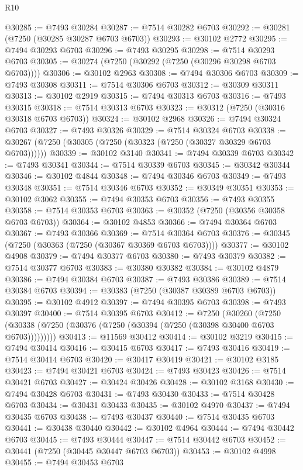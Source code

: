 \begin{lexlean}{R10}
\begin{coremodule}
@30285 := @7493 @30284
@30287 := @7514 @30282 @6703
@30292 := @30281 (@7250 (@30285 @30287 @6703 @6703))
@30293 := @30102 @2772
@30295 := @7494 @30293 @6703
@30296 := @7493 @30295
@30298 := @7514 @30293 @6703
@30305 := @30274 (@7250 (@30292 (@7250 (@30296 @30298 @6703 @6703))))
@30306 := @30102 @2963
@30308 := @7494 @30306 @6703
@30309 := @7493 @30308
@30311 := @7514 @30306 @6703
@30312 := @30309 @30311
@30313 := @30102 @2919
@30315 := @7494 @30313 @6703
@30316 := @7493 @30315
@30318 := @7514 @30313 @6703
@30323 := @30312 (@7250 (@30316 @30318 @6703 @6703))
@30324 := @30102 @2968
@30326 := @7494 @30324 @6703
@30327 := @7493 @30326
@30329 := @7514 @30324 @6703
@30338 := @30267 (@7250 (@30305 (@7250 (@30323 (@7250 (@30327 @30329 @6703 @6703))))))
@30339 := @30102 @3140
@30341 := @7494 @30339 @6703
@30342 := @7493 @30341
@30344 := @7514 @30339 @6703
@30345 := @30342 @30344
@30346 := @30102 @4844
@30348 := @7494 @30346 @6703
@30349 := @7493 @30348
@30351 := @7514 @30346 @6703
@30352 := @30349 @30351
@30353 := @30102 @3062
@30355 := @7494 @30353 @6703
@30356 := @7493 @30355
@30358 := @7514 @30353 @6703
@30363 := @30352 (@7250 (@30356 @30358 @6703 @6703))
@30364 := @30102 @4853
@30366 := @7494 @30364 @6703
@30367 := @7493 @30366
@30369 := @7514 @30364 @6703
@30376 := @30345 (@7250 (@30363 (@7250 (@30367 @30369 @6703 @6703))))
@30377 := @30102 @4908
@30379 := @7494 @30377 @6703
@30380 := @7493 @30379
@30382 := @7514 @30377 @6703
@30383 := @30380 @30382
@30384 := @30102 @4879
@30386 := @7494 @30384 @6703
@30387 := @7493 @30386
@30389 := @7514 @30384 @6703
@30394 := @30383 (@7250 (@30387 @30389 @6703 @6703))
@30395 := @30102 @4912
@30397 := @7494 @30395 @6703
@30398 := @7493 @30397
@30400 := @7514 @30395 @6703
@30412 := @7250
    (@30260 (@7250 (@30338 (@7250 (@30376 (@7250 (@30394 (@7250 (@30398 @30400 @6703 @6703)))))))))
@30413 := @11569 @30412
@30414 := @30102 @3219
@30415 := @7494 @30414
@30416 := @30415 @6703
@30417 := @7493 @30416
@30419 := @7514 @30414 @6703
@30420 := @30417 @30419
@30421 := @30102 @3185
@30423 := @7494 @30421 @6703
@30424 := @7493 @30423
@30426 := @7514 @30421 @6703
@30427 := @30424 @30426
@30428 := @30102 @3168
@30430 := @7494 @30428 @6703
@30431 := @7493 @30430
@30433 := @7514 @30428 @6703
@30434 := @30431 @30433
@30435 := @30102 @4970
@30437 := @7494 @30435 @6703
@30438 := @7493 @30437
@30440 := @7514 @30435 @6703
@30441 := @30438 @30440
@30442 := @30102 @4964
@30444 := @7494 @30442 @6703
@30445 := @7493 @30444
@30447 := @7514 @30442 @6703
@30452 := @30441 (@7250 (@30445 @30447 @6703 @6703))
@30453 := @30102 @4998
@30455 := @7494 @30453 @6703

\end{coremodule}
\end{lexlean}
